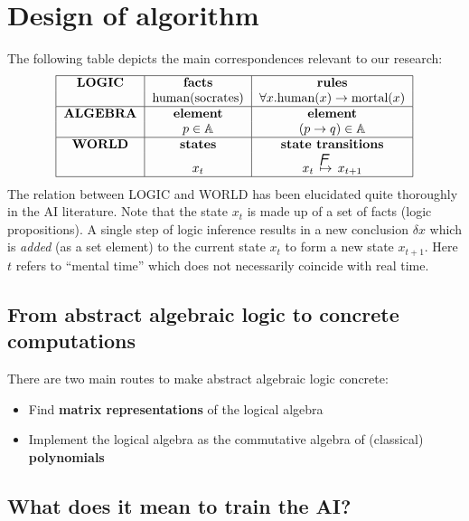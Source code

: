 \chapter{Design of algorithm}\label{chap:algorithm}

The following table depicts the main correspondences relevant to our research:
\begin{equation}
\begin{tabular}{|c|c|c|}
\hline
\textbf{LOGIC} & \textbf{facts} & \textbf{rules} \\
& \mbox{human(socrates)} & $\forall x. \mbox{human}(x) \rightarrow \mbox{mortal}(x)$ \\
\hline
\textbf{ALGEBRA} & \textbf{element} & \textbf{element} \\
& $p \in \mathbb{A} $ & $(p \rightarrow q) \in \mathbb{A} $ \\
\hline
\textbf{WORLD} & \textbf{states} & \textbf{state transitions} \\
& $x_t$ & $x_t \stackrel{\squareF}{\mapsto} x_{t+1}$ \\
\hline
\end{tabular}
\end{equation}
The relation between LOGIC and WORLD has been elucidated quite thoroughly in the AI literature.  Note that the state $x_t$ is made up of a set of facts (logic propositions).  A single step of logic inference results in a new conclusion $\delta x$ which is \textit{added} (as a set element) to the current state $x_t$ to form a new state $x_{t+1}$.  Here $t$ refers to ``mental time'' which does not necessarily coincide with real time.

\section{From abstract algebraic logic to concrete computations}

There are two main routes to make abstract algebraic logic concrete:
\begin{itemize}
	\item Find \textbf{matrix representations} of the logical algebra
	\item Implement the logical algebra as the commutative algebra of (classical) \textbf{polynomials}
\end{itemize}

\section{What does it mean to train the AI?}

